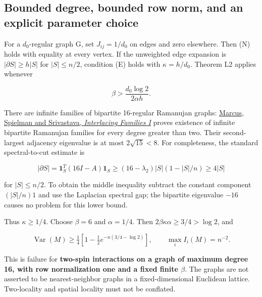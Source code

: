 \subsection{Bounded degree, bounded row norm, and an explicit parameter
choice}\label{proof:local_interactions:bounded-degree-bounded-row-norm-and-an-explicit-parameter-choice}

For a \(d_{0}\)-regular graph G, set \(J_{ij}=1/d_{0}\) on edges and
zero elsewhere. Then (N) holds with equality at every vertex. If the
unweighted edge expansion is \(|\partial S|\ge h|S|\) for
\(|S|\le n/2\), condition (E) holds with \(\kappa =h/d_{0}\). Theorem L2
applies whenever

\[
\beta>\frac{d_0\log2}{2\alpha h}.
\]

There are infinite families of bipartite 16-regular Ramanujan graphs:
\href{https://arxiv.org/abs/1304.4132}{Marcus, Spielman and Srivastava,
\emph{Interlacing Families I}} proves existence of infinite bipartite
Ramanujan families for every degree greater than two. Their
second-largest adjacency eigenvalue is at most \(2\sqrt{15}<8\). For
completeness, the standard spectral-to-cut estimate is

\[
|\partial S|=\mathbf1_S^T(16I-A)\mathbf1_S
\ge(16-\lambda_2)|S|(1-|S|/n)\ge4|S|
\]

for \(|S|\le n/2\). To obtain the middle inequality subtract the
constant component \((|S|/n)1\) and use the Laplacian spectral gap; the
bipartite eigenvalue \(-16\) causes no problem for this lower bound.

Thus \(\kappa \ge 1/4\). Choose \(\beta =6\) and \(\alpha =1/4\). Then
\(2\beta \kappa \alpha \ge 3/4>\log 2\), and

\[
\operatorname{Var}(M)\ge\tfrac14\left[1-\tfrac12e^{-n(3/4-\log2)}\right],
\qquad \max_i I_i(M)=n^{-2}.
\tag{4.1}
\]

This is failure for \textbf{two-spin interactions on a graph of maximum
degree 16, with row normalization one and a fixed finite \(\beta\)}. The
graphs are not asserted to be nearest-neighbor graphs in a
fixed-dimensional Euclidean lattice. Two-locality and spatial locality
must not be conflated.
